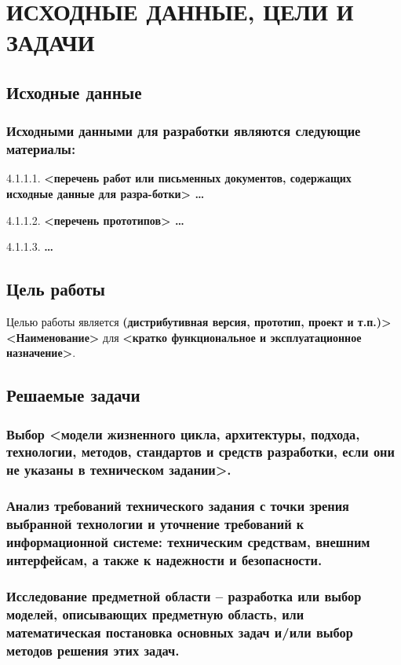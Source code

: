 \documentclass[12pt, left=30mm, right=15mm, top=20mm, bottom=20mm]{templateReportBMSTU}
\begin{document}
	\section{ИСХОДНЫЕ ДАННЫЕ, ЦЕЛИ И ЗАДАЧИ}
	\subsection{Исходные данные} \label{4}
	\subsubsection{Исходными данными для разработки являются следующие материалы:}
	4.1.1.1. \textbf{<перечень работ или письменных документов, содержащих исходные данные для разра-ботки> …}

	4.1.1.2. \textbf{<перечень прототипов> …}

	4.1.1.3. \textbf{…}
	\subsection{Цель работы}
	Целью работы является \textbf{(дистрибутивная версия, прототип, проект и т.п.)>} \textbf{<Наименование>} для \textbf{<кратко функциональное и эксплуатационное назначение>}.

	\subsection{Решаемые задачи}
	\subsubsection{Выбор \textbf{<модели жизненного цикла, архитектуры, подхода, технологии, методов, стандартов и средств разработки, если они не указаны в техническом задании>}.}

	\subsubsection{\textbf{Анализ требований технического задания с точки зрения выбранной технологии и уточнение требований к информационной системе: техническим средствам, внешним интерфейсам, а также к надежности и безопасности.}}
	\hfill
	\subsubsection{\textbf{Исследование предметной области  – разработка или выбор моделей, описывающих предметную область, или математическая постановка основных задач и/или выбор методов решения этих задач.}}
\end{document}
